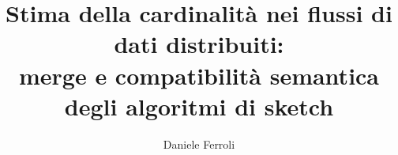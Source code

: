 \title{\texorpdfstring{Stima della cardinalità nei flussi di dati distribuiti:\\
merge e compatibilità semantica degli algoritmi di sketch}{Stima della cardinalità nei flussi di dati distribuiti: merge e compatibilità semantica degli algoritmi di sketch}}
\author{Daniele Ferroli}




